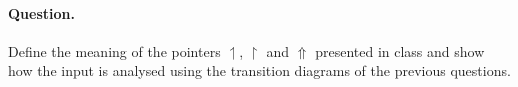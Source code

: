 \paragraph{Question.} Define the meaning of the pointers
\(\upharpoonleft\), \(\upharpoonright\) and \(\Uparrow\) presented in
class and show how the input is analysed using the transition diagrams
of the previous questions.

